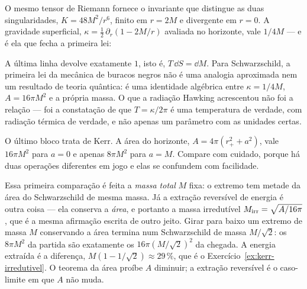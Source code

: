 O mesmo tensor de Riemann fornece o invariante que distingue as duas
singularidades, $K = 48M^{2}/r^{6}$, finito em $r=2M$ e divergente em $r=0$.
A gravidade superficial, $\kappa = \tfrac12\,\partial_r(1-2M/r)$ avaliada no
horizonte, vale $1/4M$ --- e é ela que fecha a primeira lei:

\begin{central}
A última linha devolve exatamente $1$, isto é, $T\,\dd S = \dd M$. Para
Schwarzschild, a primeira lei da mecânica de buracos negros não é uma
analogia aproximada nem um resultado de teoria quântica: é uma identidade
algébrica entre $\kappa = 1/4M$, $A = 16\pi M^{2}$ e a própria massa. O que a
radiação Hawking acrescentou não foi a relação --- foi a constatação de que
$T = \kappa/2\pi$ é uma temperatura de verdade, com radiação térmica de
verdade, e não apenas um parâmetro com as unidades certas.
\end{central}

O último bloco trata de Kerr. A área do horizonte,
$A = 4\pi(r_{+}^{2}+a^{2})$, vale $16\pi M^{2}$ para $a=0$ e apenas
$8\pi M^{2}$ para $a=M$. Compare com cuidado, porque há duas operações
diferentes em jogo e elas se confundem com facilidade.

Essa primeira comparação é feita a \emph{massa total} $M$ fixa: o extremo
tem metade da área do Schwarzschild de mesma massa. Já a extração reversível
de energia é outra coisa --- ela conserva a \emph{área}, e portanto a massa
irredutível $M_{\rm irr}=\sqrt{A/16\pi}$, que é a mesma afirmação escrita de
outro jeito. Girar para baixo um extremo de massa $M$ conservando a área
termina num Schwarzschild de massa $M/\sqrt2$: os $8\pi M^{2}$ da partida são
exatamente os $16\pi(M/\sqrt2)^{2}$ da chegada. A energia extraída é a
diferença, $M(1-1/\sqrt2)\approx29\,\%$, que é o
Exercício~\ref{ex:kerr-irredutivel}. O teorema da área proíbe $A$ diminuir;
a extração reversível é o caso-limite em que $A$ não muda.

